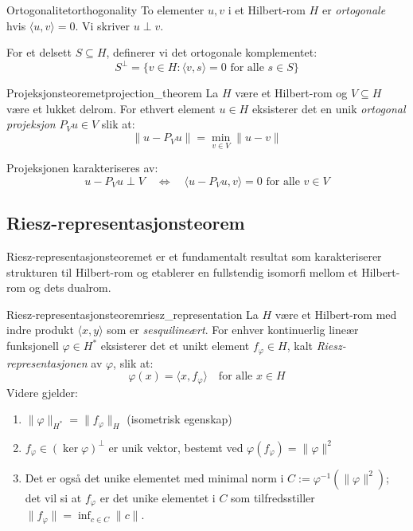 \documentclass[../main.tex]{subfiles}
\begin{document}
\begin{definition}{Ortogonalitet}{orthogonality}
	To elementer $u, v$ i et Hilbert-rom $H$ er \emph{ortogonale} hvis $\langle u, v \rangle = 0$. Vi skriver $u \perp v$.

	For et delsett $S \subseteq H$, definerer vi det ortogonale komplementet:
	\begin{equation}
		S^\perp = \{v \in H : \langle v, s \rangle = 0 \text{ for alle } s \in S\}
	\end{equation}
\end{definition}

\begin{theorem}{Projeksjonsteoremet}{projection_theorem}
	La $H$ være et Hilbert-rom og $V \subseteq H$ være et lukket delrom. For ethvert element $u \in H$ eksisterer det en unik \emph{ortogonal projeksjon} $P_V u \in V$ slik at:
	\begin{equation}
		\|u - P_V u\| = \min_{v \in V} \|u - v\|
	\end{equation}

	Projeksjonen karakteriseres av:
	\begin{equation}
		u - P_V u \perp V \quad \Leftrightarrow \quad \langle u - P_V u, v \rangle = 0 \text{ for alle } v \in V
	\end{equation}
\end{theorem}

\subsection{Riesz-representasjonsteorem}
Riesz-representasjonsteoremet er et fundamentalt resultat som karakteriserer strukturen til Hilbert-rom og etablerer en fullstendig isomorfi mellom et Hilbert-rom og dets dualrom.
\begin{theorem}{Riesz-representasjonsteorem}{riesz_representation}
	La $H$ være et Hilbert-rom med indre produkt $\langle x, y \rangle$ som er \emph{sesquilineært}.
	For enhver kontinuerlig lineær funksjonell $\varphi \in H^\ast$ eksisterer det et unikt element $f_\varphi \in H$, kalt \emph{Riesz-representasjonen} av $\varphi$, slik at:
	\begin{equation}
		\varphi(x) = \langle x, f_\varphi \rangle \quad \text{for alle } x \in H
	\end{equation}
	Videre gjelder:
	\begin{enumerate}
		\item \(\|\varphi\|_{H^\ast} = \|f_\varphi\|_H\) (isometrisk egenskap)
		\item \(f_\varphi \in (\ker \varphi)^\perp\) er unik vektor, bestemt ved \(\varphi(f_\varphi) = \|\varphi\|^2\)
		\item Det er også det unike elementet med minimal norm i \( C := \varphi^{-1}(\|\varphi\|^2) \); det vil si at \( f_\varphi \) er det unike elementet i \( C \) som tilfredsstiller \( \|f_\varphi\| = \inf_{c \in C} \|c\| \).
	\end{enumerate}
\end{theorem}
\end{document}
